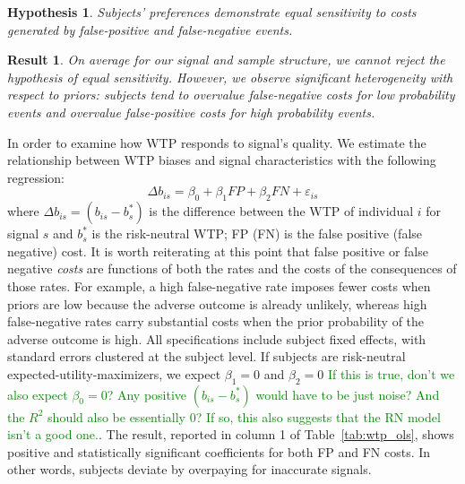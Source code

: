\documentclass[12pt,a4paper]{article}
\newtheorem{hypothesis}{Hypothesis}
\newtheorem{result}{Result}
\begin{document}

%






\begin{hypothesis}\label{hyp:eqSen} 
Subjects' preferences demonstrate equal sensitivity to costs generated by false-positive and false-negative events. 
\end{hypothesis}

\begin{result} 
On average for our signal and sample structure, we cannot reject the hypothesis of equal sensitivity. However, we observe significant heterogeneity with respect to priors: subjects tend to overvalue false-negative costs for low probability events and overvalue false-positive costs for high probability events. 
\end{result}


In order to examine how WTP responds to signal's quality. We estimate the relationship between WTP biases and signal characteristics with the following regression:
\[\Delta b_{is} = \beta_0 + \beta_1 FP + \beta_2 FN + \varepsilon_{is}\]
where $\Delta b_{is} = (b_{is} - b^*_s)$ is the difference between the WTP of individual $i$ for signal $s$ and $b^*_s$ is the risk-neutral WTP; FP (FN) is the false positive (false negative) cost.  It is worth reiterating at this point that false positive or false negative \textit{costs} are functions of both the rates and the costs of the consequences of those rates.  For example, a high false-negative rate imposes fewer costs when priors are low because the adverse outcome is already unlikely, whereas high false-negative rates carry substantial costs when the prior probability of the adverse outcome is high. All specifications include subject fixed effects, with standard errors clustered at the subject level. If subjects are risk-neutral expected-utility-maximizers, we expect $\beta_1=0$ and $\beta_2=0$ \textcolor{green}{If this is true, don't we also expect $\beta_0=0$?  Any positive $(b_{is} - b^*_s)$ would have to be just noise? And the $R^2$ should also be essentially 0?  If so, this also suggests that the RN model isn't a good one.}. The result, reported in column 1 of Table~\ref{tab:wtp_ols}, shows positive and statistically significant coefficients for both FP and FN costs. In other words, subjects deviate by overpaying for inaccurate signals. 
\end{document}
